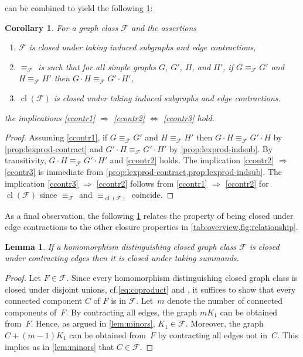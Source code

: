 \documentclass[3p,final]{elsarticle}
\DeclareMathOperator{\cl}{cl}
\newtheorem{lemma}[theorem]{Lemma}
\newtheorem{corollary}[theorem]{Corollary}
\begin{document}
	 can be combined to yield the following \cref{cor:lexprod}:
	
	\begin{corollary} \label{cor:lexprod}
		For a graph class $\mathcal{F}$ and the assertions
		\begin{enumerate}
			\item $\mathcal{F}$ is closed under taking induced subgraphs and edge contractions,\label{ccontr1}
			\item $\equiv_{\mathcal{F}}$ is such that for all simple  graphs $G$, $G'$, $H$, and $H'$, if $G \equiv_{\mathcal{F}} G'$ and $H \equiv_{\mathcal{F}} H'$ then $G \cdot H \equiv_{\mathcal{F}} G' \cdot H'$,\label{ccontr2}
			\item $\cl(\mathcal{F})$ is closed under taking induced subgraphs and edge contractions.\label{ccontr3}
		\end{enumerate}
		the implications \ref{ccontr1} $\Rightarrow$ \ref{ccontr2} $\Leftrightarrow$ \ref{ccontr3}  hold.
	\end{corollary}
	\begin{proof}Assuming \ref{ccontr1}, if $G \equiv_{\mathcal{F}} G'$ and $H \equiv_{\mathcal{F}} H'$ then $G \cdot H \equiv_{\mathcal{F}} G' \cdot H$ by \cref{prop:lexprod-contract}
		and $G' \cdot H \equiv_{\mathcal{F}} G' \cdot H'$ by \cref{prop:lexprod-indsub}.
		By transitivity, $G \cdot H \equiv_{\mathcal{F}} G' \cdot H'$ and \ref{ccontr2} holds. The implication \ref{ccontr2} $\Rightarrow$ \ref{ccontr3} is immediate from \cref{prop:lexprod-contract,prop:lexprod-indsub}.
		The implication \ref{ccontr3} $\Rightarrow$ \ref{ccontr2} follows from \ref{ccontr1} $\Rightarrow$ \ref{ccontr2} for $\cl(\mathcal{F})$ since $\equiv_{\mathcal{F}}$ and $\equiv_{\cl(\mathcal{F})}$ coincide.  
	\end{proof}
	
	
	As a final observation, the following \cref{lem:contr} relates the property of being closed under edge contractions to the other closure properties in \cref{tab:overview,fig:relationship}.

	\begin{lemma} \label{lem:contr}
		If a homomorphism distinguishing closed graph class $\mathcal{F}$ is closed under contracting edges then it is closed under taking summands.
	\end{lemma}
	\begin{proof}Let $F \in \mathcal{F}$. Since every homomorphism distinguishing closed graph class is closed under disjoint unions, cf.\@ \cref{eq:coproduct} and \cite{roberson_oddomorphisms_2022}, it suffices to show that every connected component $C$ of $F$ is in $\mathcal{F}$. Let~$m$ denote the number of connected components of~$F$. 
		By contracting all edges, the graph $mK_1$ can be obtained from~$F$.
		Hence, as argued in \cref{lem:minors}, $K_1 \in \mathcal{F}$. 
		Moreover, the graph $C + (m-1)K_1$ can be obtained from~$F$ by contracting all edges not in~$C$. This implies as in \cref{lem:minors} that $C \in \mathcal{F}$.
	\end{proof}
\end{document}
